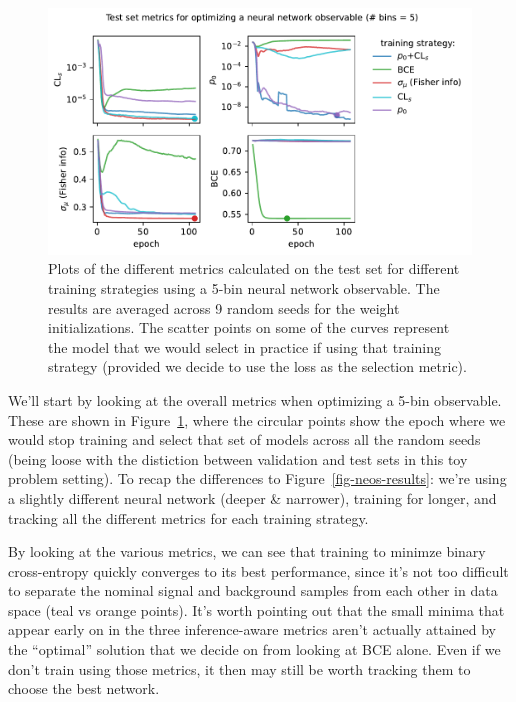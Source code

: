\documentclass[
  11pt,
  numbers=noendperiod]{book}
\begin{document}
\begin{figure}

{\centering \includegraphics{./images/test_metricsfewnobins.pdf}

}

\caption{\label{fig-newneos-5bin-fixed}Plots of the different metrics
calculated on the test set for different training strategies using a
5-bin neural network observable. The results are averaged across 9
random seeds for the weight initializations. The scatter points on some
of the curves represent the model that we would select in practice if
using that training strategy (provided we decide to use the loss as the
selection metric).}

\end{figure}

We'll start by looking at the overall metrics when optimizing a 5-bin
observable. These are shown in Figure~\ref{fig-newneos-5bin-fixed},
where the circular points show the epoch where we would stop training
and select that set of models across all the random seeds (being loose
with the distiction between validation and test sets in this toy problem
setting). To recap the differences to Figure~\ref{fig-neos-results}:
we're using a slightly different neural network (deeper \& narrower),
training for longer, and tracking all the different metrics for each
training strategy.

By looking at the various metrics, we can see that training to minimze
binary cross-entropy quickly converges to its best performance, since
it's not too difficult to separate the nominal signal and background
samples from each other in data space (teal vs orange points). It's
worth pointing out that the small minima that appear early on in the
three inference-aware metrics aren't actually attained by the
``optimal'' solution that we decide on from looking at BCE alone. Even
if we don't train using those metrics, it then may still be worth
tracking them to choose the best network.
\end{document}

